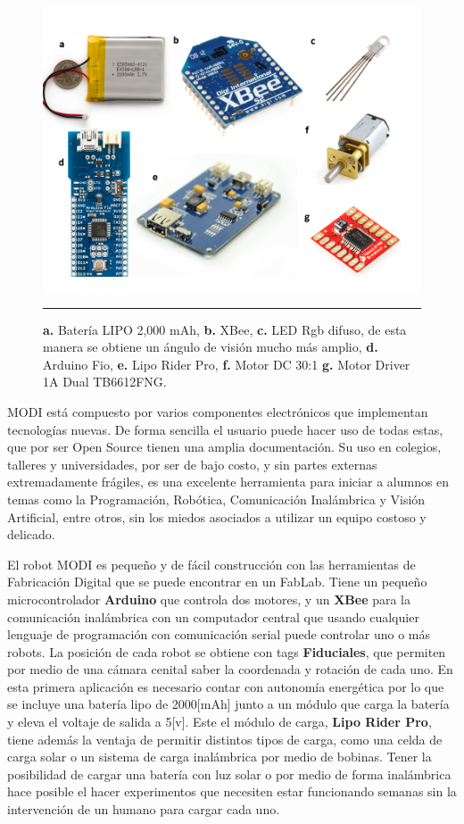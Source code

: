 \begin{figure}[htbp]
	\centering
		\includegraphics[width=\textwidth]{./Figures/MODI/compElo.png}
		\rule{35em}{0.5pt}
	\caption[Componentes Electrónicos]{\textbf{a.} Batería LIPO 2,000 mAh, \textbf{b.} XBee, \textbf{c.} LED Rgb difuso, de esta manera se obtiene un ángulo de visión mucho más amplio, \textbf{d.} Arduino Fio, \textbf{e.} Lipo Rider Pro,\textbf{ f.} Motor DC 30:1 \textbf{g.} Motor Driver 1A Dual TB6612FNG.}
	\label{fig:compELO}
\end{figure}

MODI está compuesto por varios componentes electrónicos que implementan tecnologías nuevas. De forma sencilla el usuario puede hacer uso de todas estas, que por ser Open Source tienen una amplia documentación. Su uso en colegios, talleres y universidades, por ser de bajo costo, y sin partes externas extremadamente frágiles, es una excelente herramienta para iniciar a alumnos en temas como la Programación, Robótica, Comunicación Inalámbrica y Visión Artificial, entre otros, sin los miedos asociados a utilizar un equipo costoso y delicado.

El robot MODI es pequeño y de fácil construcción con las herramientas de Fabricación Digital que se puede encontrar en un FabLab. Tiene un pequeño microcontrolador \textbf{Arduino} que controla dos motores, y un \textbf{XBee} para la comunicación inalámbrica con un computador central que usando cualquier lenguaje de programación con comunicación serial puede controlar uno o más robots. La posición de cada robot se obtiene con tags \textbf{Fiduciales}, que permiten por medio de una cámara cenital saber la coordenada y rotación de cada uno. En esta primera aplicación es necesario contar con autonomía energética por lo que se incluye una batería lipo de 2000[mAh] junto a un módulo que carga la batería y eleva el voltaje de salida a 5[v]. Este el módulo de carga, \textbf{Lipo Rider Pro}, tiene además la ventaja de permitir distintos tipos de carga, como una celda de carga solar o un sistema de carga inalámbrica por medio de bobinas. Tener la posibilidad de cargar una batería con luz solar o por medio de forma inalámbrica hace posible el hacer experimentos que necesiten estar funcionando semanas sin la intervención de un humano para cargar cada uno.

